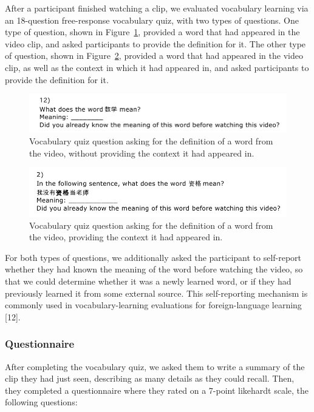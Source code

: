 \documentclass{sigchi}
\begin{document}
After a participant finished watching a clip, we evaluated vocabulary learning via an 18-question free-response vocabulary quiz, with two types of questions. One type of question, shown in Figure~\ref{fig:figure4}, provided a word that had appeared in the video clip, and asked participants to provide the definition for it. The other type of question, shown in Figure~\ref{fig:figure5}, provided a word that had appeared in the video clip, as well as the context in which it had appeared in, and asked participants to provide the definition for it.

\begin{figure}[!h]
\centering
\includegraphics[width=\columnwidth]{vocab-quiz-1}
\caption{Vocabulary quiz question asking for the definition
of a word from the video, without providing the context it had appeared in.}
\label{fig:figure4}
\end{figure}

\begin{figure}[!h]
\centering
\includegraphics[width=\columnwidth]{vocab-quiz-2}
\caption{Vocabulary quiz question asking for the definition
of a word from the video, providing the context it had appeared in.}
\label{fig:figure5}
\end{figure}

For both types of questions, we additionally asked the participant to self-report whether they had known the meaning of the word before watching the video, so that we could determine whether it was a newly learned word, or if they had previously learned it from some external source. This self-reporting mechanism is commonly used in vocabulary-learning evaluations for foreign-language learning [12].

\subsubsection{Questionnaire}

After completing the vocabulary quiz, we asked them to write a summary of the clip they had
just seen, describing as many details as they could recall. Then, they completed
a questionnaire where they rated on a 7-point likehardt scale, the following questions:
\end{document}
